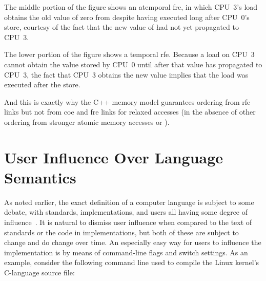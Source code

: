 \documentclass[10]{article}
\begin{document}
The middle portion of the figure shows an atemporal fre, in which
CPU~3's load obtains the old value of zero from  despite
having executed long after CPU~0's store, courtesy of the fact
that the new value of  had not yet propagated to CPU~3.

The lower portion of the figure shows a temporal rfe.
Because a load on CPU~3 cannot obtain the value stored by CPU~0 until
after that value has propagated to CPU~3, the fact that CPU~3 obtains
the new value implies that the load was executed after the store.

And this is exactly why the C++ memory model guarantees ordering from
rfe links but not from coe and fre links for relaxed accesses (in the
absence of other ordering from stronger atomic memory accesses or
).

\clearpage

\section{User Influence Over Language Semantics}
\label{app:User Influence Over Language Semantics}

As noted earlier, the exact definition of a computer language is subject
to some debate, with standards, implementations, and users all having
some degree of
influence~\cite{KayvanMemarian2016DepthOfC-1,KayvanMemarian2016DepthOfC-2}.
It is natural to dismiss user influence when compared to the text of
standards or the code in implementations, but both of these are subject to
change and do change over time.
An especially easy way for users to influence the implementation is by
means of command-line flags and switch settings.
As an example,
consider the following command line used to compile the Linux kernel's
 C-language source file:
\end{document}
